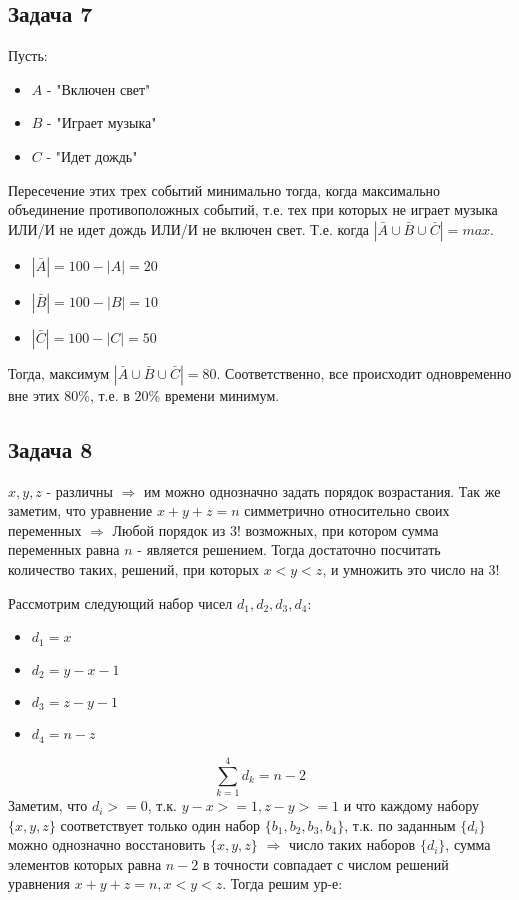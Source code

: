 \documentclass{article}
\begin{document}
 \begin{center}
 	\subsection*{Задача 7}
 \end{center}
 Пусть:
 \begin{itemize}
 	\item{}$ A $ - "Включен свет" 
 	\item{}$ B $ - "Играет музыка"
 	\item{}$ C $ - "Идет дождь"
\end{itemize}
Пересечение этих трех событий минимально тогда, когда максимально объединение противоположных событий, т.е. тех при которых не играет музыка ИЛИ/И не идет дождь ИЛИ/И не включен свет. Т.е. когда $|\bar{A} \cup \bar{B} \cup \bar{C}| = max$.
 \begin{itemize}
 	\item{}$ |\bar{A}| = 100 - |A| = 20 $ 
 	\item{}$ |\bar{B}| = 100 - |B| = 10 $
 	\item{}$ |\bar{C}| = 100 - |C| = 50 $
 \end{itemize}
 Тогда, максимум $|\bar{A} \cup \bar{B} \cup \bar{C}| = 80$.
 Соответственно, все происходит одновременно вне этих $80\%$, т.е. в $20\%$ времени минимум.
 \begin{center}
 	\subsection*{Задача 8}
 \end{center}
 $x, y, z$ - различны $ \Rightarrow $ им можно однозначно задать порядок возрастания. Так же заметим, что уравнение $ x + y + z = n $ симметрично относительно своих переменных $\Rightarrow$ Любой порядок из $3!$ возможных, при котором сумма переменных равна $n$ - является решением. Тогда достаточно посчитать количество таких, решений, при которых $x < y < z$, и умножить это число на $3!$
 
 Рассмотрим следующий набор чисел $d_1, d_2, d_3, d_4$: 
 \begin{itemize}
 	\item{}$ d_1 = x$ 
 	\item{}$ d_2 = y - x - 1$
 	\item{}$ d_3 = z - y - 1$
 	\item{}$ d_4 = n - z$
 \end{itemize}
 $$ \sum_{k=1}^{4}d_k = n - 2$$
  Заметим, что $d_i >= 0$, т.к. $y - x >= 1, z - y >= 1$ и что каждому набору $\{x, y, z\}$ соответствует только один набор $\{b_1, b_2, b_3, b_4\}$, т.к. по заданным $\{d_i\}$ можно однозначно восстановить $\{x, y, z\}$ $\Rightarrow$ число таких наборов  $\{d_i\}$, сумма элементов которых равна $n - 2$ в точности совпадает с числом решений  уравнения $x + y + z = n, x < y < z$. Тогда решим ур-е:
   
\end{document}
